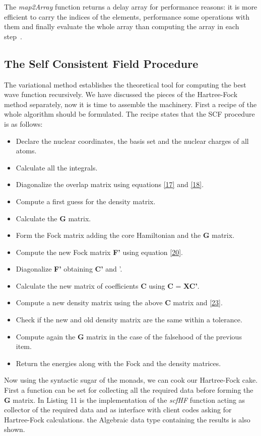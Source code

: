 \documentclass{tmr}
\begin{document}
The \textit{map2Array} function returns a delay array for performance reasons: it is more efficient
to carry the indices of the elements, performance some operations with them and finally
evaluate the whole array than computing the array in each step~\cite{fusion}.

\subsection{The Self Consistent Field Procedure}

The variational method establishes the theoretical tool for computing the best
wave function recursively. We have discussed the pieces of the Hartree-Fock
method separately, now it is time to assemble the machinery. First a recipe of the 
whole algorithm should be formulated. The recipe states that the SCF procedure is 
as follows:
  
\begin{itemize}
\item Declare the nuclear coordinates, the basis set and the nuclear
charges of all atoms.
\item Calculate all the integrals.
\item Diagonalize the overlap matrix using equations \eqref{17} and \eqref{18}.
\item Compute a first guess for the density matrix.
\item Calculate the \textbf{G} matrix.
\item Form the Fock matrix adding the core Hamiltonian and the \textbf{G} matrix.
\item Compute the new Fock matrix \textbf{F'} using equation \eqref{20}.
\item Diagonalize \textbf{F'} obtaining \textbf{C'} and \textepsilon'.
\item Calculate the new matrix of coefficients \textbf{C} using \textbf{C} = \textbf{XC'}.  
\item Compute a new density matrix using the above \textbf{C} matrix and \eqref{23}.
\item Check if the new and old density matrix are the same within a tolerance.
\item Compute again the \textbf{G} matrix in the case of the falsehood of the previous item. 
\item Return the energies along with the Fock and the density matrices.
\end{itemize}

Now using the syntactic sugar of the monads, we can cook our Hartree-Fock cake. First 
a function can be set for collecting all the required data before forming the 
\textbf{G} matrix. In Listing 11 is the implementation of the \textit{scfHF} function acting
as collector of the required data and as interface with client codes asking
for Hartree-Fock calculations. the Algebraic data type containing the results 
is also shown.
\end{document}
